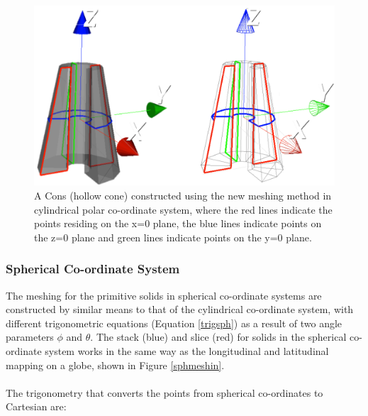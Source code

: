 \documentclass[12pt,a4paper]{article}
\begin{document}
\begin{figure}[h!]
\centering
\includegraphics[scale=0.3]{Images//Coords//consco.png}
\caption[width=\columnwidth]{A Cons (hollow cone) constructed using the new meshing method in cylindrical polar co-ordinate system, where the red lines indicate the points residing on the x=0 plane, the blue lines indicate points on the z=0 plane and green lines indicate points on the y=0 plane.}
\label{consco}
\end{figure}

\newpage
\subsubsection{Spherical Co-ordinate System}\label{sphh}
The meshing for the primitive solids in spherical co-ordinate systems are constructed by similar means to that of the cylindrical co-ordinate system, with different trigonometric equations (Equation \ref{trigsph}) as a result of two angle parameters $\phi$ and $\theta$. The stack (blue) and slice (red) for solids in the spherical co-ordinate system works in the same way as the longitudinal and latitudinal mapping on a globe, shown in Figure \ref{sphmeshin}. 
\\\\
The trigonometry that converts the points from spherical co-ordinates to Cartesian are:
\end{document}

